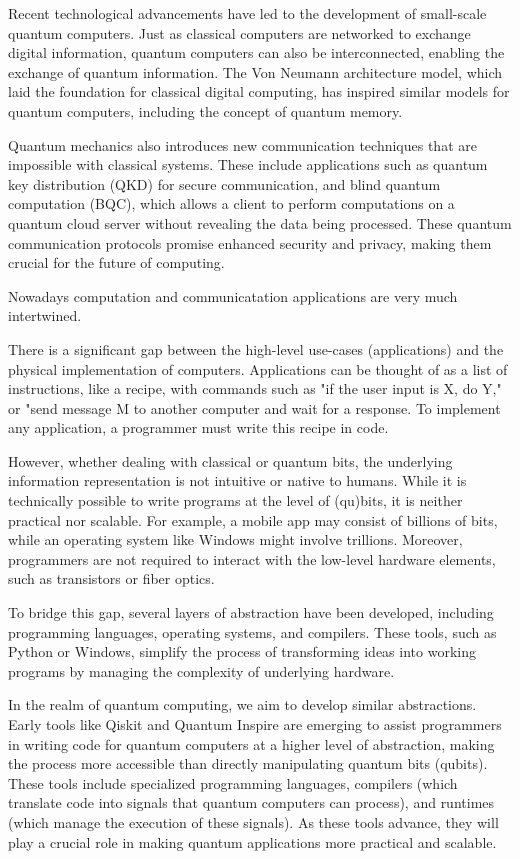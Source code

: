 Recent technological advancements have led to the development of small-scale quantum computers.
Just as classical computers are networked to exchange digital information, quantum computers can also be interconnected, enabling the exchange of quantum information.
The Von Neumann architecture model, which laid the foundation for classical digital computing, has inspired similar models for quantum computers, including the concept of quantum memory.

Quantum mechanics also introduces new communication techniques that are impossible with classical systems.
These include applications such as quantum key distribution (QKD) for secure communication, and blind quantum computation (BQC), which allows a client to perform computations on a quantum cloud server without revealing the data being processed.
These quantum communication protocols promise enhanced security and privacy, making them crucial for the future of computing.


Nowadays computation and communicatation applications are very much intertwined.

There is a significant gap between the high-level use-cases (applications) and the physical implementation of computers.
Applications can be thought of as a list of instructions, like a recipe, with commands such as "if the user input is X, do Y," or "send message M to another computer and wait for a response.
To implement any application, a programmer must write this recipe in code.

However, whether dealing with classical or quantum bits, the underlying information representation is not intuitive or native to humans.
While it is technically possible to write programs at the level of (qu)bits, it is neither practical nor scalable.
For example, a mobile app may consist of billions of bits, while an operating system like Windows might involve trillions.
Moreover, programmers are not required to interact with the low-level hardware elements, such as transistors or fiber optics.

To bridge this gap, several layers of abstraction have been developed, including programming languages, operating systems, and compilers.
These tools, such as Python or Windows, simplify the process of transforming ideas into working programs by managing the complexity of underlying hardware.

In the realm of quantum computing, we aim to develop similar abstractions.
Early tools like Qiskit and Quantum Inspire are emerging to assist programmers in writing code for quantum computers at a higher level of abstraction, making the process more accessible than directly manipulating quantum bits (qubits).
These tools include specialized programming languages, compilers (which translate code into signals that quantum computers can process), and runtimes (which manage the execution of these signals).
As these tools advance, they will play a crucial role in making quantum applications more practical and scalable.

